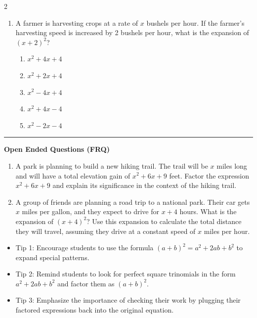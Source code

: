 \documentclass[10pt]{article}
\begin{document}
\begin{multicols}{2}
\begin{enumerate}[label=\textbf{Q\arabic*.}, leftmargin=*, itemsep=6pt, parsep=0pt]
  \item \small A farmer is harvesting crops at a rate of $x$ bushels per hour. If the farmer's harvesting speed is increased by 2 bushels per hour, what is the expansion of $(x + 2)^2$?
  \begin{enumerate}[label=(\Alph*), leftmargin=0.6cm, nosep, itemsep=2pt]
    \item $x^2 + 4x + 4$
    \item $x^2 + 2x + 4$
    \item $x^2 - 4x + 4$
    \item $x^2 + 4x - 4$
    \item $x^2 - 2x - 4$
  \end{enumerate}

\end{enumerate}
\end{multicols}

\vspace{-0.2cm}
\hrule
\vspace{0.2cm}
\textbf{\small Open Ended Questions (FRQ)}
\begin{enumerate}[label=\textbf{Q\arabic*.}, start=9, itemsep=5pt, topsep=0pt]

  \item \small A park is planning to build a new hiking trail. The trail will be $x$ miles long and will have a total elevation gain of $x^2 + 6x + 9$ feet. Factor the expression $x^2 + 6x + 9$ and explain its significance in the context of the hiking trail. \vspace{2cm}

  \item \small A group of friends are planning a road trip to a national park. Their car gets $x$ miles per gallon, and they expect to drive for $x + 4$ hours. What is the expansion of $(x + 4)^2$? Use this expansion to calculate the total distance they will travel, assuming they drive at a constant speed of $x$ miles per hour. \vspace{2cm}

\end{enumerate}

\vfill

\begin{tcolorbox}[colback=blue!5, colframe=mainblue!50, title=\small \textbf{Chef's Tips}, fonttitle=\bfseries, bottom=1mm]
\begin{itemize}[noitemsep, topsep=2pt, leftmargin=0.5cm]
  \item \scriptsize Tip 1: Encourage students to use the formula $(a + b)^2 = a^2 + 2ab + b^2$ to expand special patterns.\item \scriptsize Tip 2: Remind students to look for perfect square trinomials in the form $a^2 + 2ab + b^2$ and factor them as $(a + b)^2$.\item \scriptsize Tip 3: Emphasize the importance of checking their work by plugging their factored expressions back into the original equation.
\end{itemize}
\end{tcolorbox}
\end{document}
